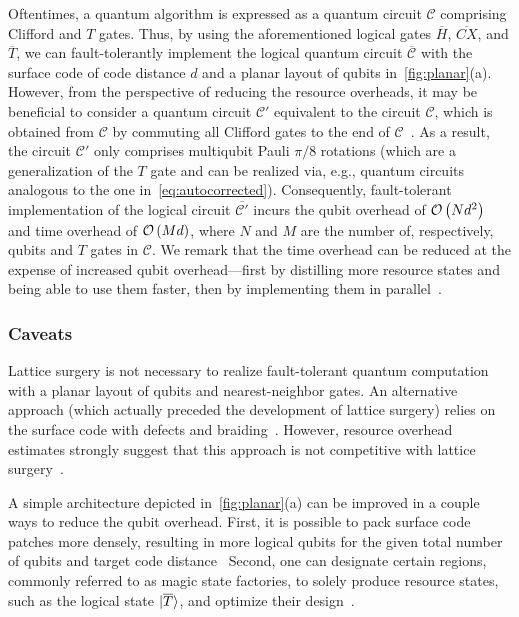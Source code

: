 \begin{refsection}
Oftentimes, a quantum algorithm is expressed as a quantum circuit $\mathcal C$ comprising Clifford and $T$ gates.
Thus, by using the aforementioned logical gates $\overline H$, $\overline{CX}$, and $\overline{T}$, we can fault-tolerantly implement the logical quantum circuit $\overline{\mathcal C}$ with the surface code of code distance $d$ and a planar layout of qubits in~\cref{fig:planar}(a).
However, from the perspective of reducing the resource overheads, it may be beneficial  to consider a quantum circuit $\mathcal C'$ equivalent to the circuit $\mathcal C$, which is obtained from $\mathcal C$ by commuting all Clifford gates to the end of $\mathcal C$~\cite{litinski2019gameofsurfacecodes}.
As a result, the circuit $\mathcal C'$ only comprises multiqubit Pauli $\pi/8$ rotations (which are a generalization of the $T$ gate and can be realized via, e.g., quantum circuits analogous to the one in~\cref{eq:autocorrected}).
Consequently, fault-tolerant implementation of the logical circuit $\overline{\mathcal{C}'}$ incurs the qubit overhead of $\mathcal{O}\left( Nd^2 \right)$ and time overhead of $\mathcal{O}\left( Md \right)$, where $N$ and $M$ are the number of, respectively, qubits and $T$ gates in $\mathcal C$.
We remark that the time overhead can be reduced at the expense of increased qubit overhead---first by distilling more resource states and being able to use them faster, then by implementing them in parallel~\cite{litinski2019gameofsurfacecodes}.



\subsubsection*{Caveats}


Lattice surgery is not necessary to realize fault-tolerant quantum computation with a planar layout of qubits and nearest-neighbor gates.
An alternative approach (which actually preceded the development of lattice surgery) relies on the surface code with defects and braiding~\cite{raussendorf2007FTQChighThreshold,raussendorf2007topologicalFaultTolerance,fowler2012SurfaceCodes,brown2017pokingHoles}.
However, resource overhead estimates strongly suggest that this approach is not competitive with lattice surgery~\cite{fowler2018}.


A simple architecture depicted in~\cref{fig:planar}(a) can be improved in a couple ways to reduce the qubit overhead.
First, it is possible to pack surface code patches more densely, resulting in more logical qubits for the given total number of qubits and target code distance~\cite{lao2018mappingLatticeSurgery,litinski2019gameofsurfacecodes}
Second, one can designate certain regions, commonly referred to as magic state factories, to solely produce resource states, such as the logical state $\lvert\overline T\rangle$, and optimize their design~\cite{OGorman2017magicStateFactories,litinski2019gameofsurfacecodes,litinski2019magicstate}.



\end{refsection}
